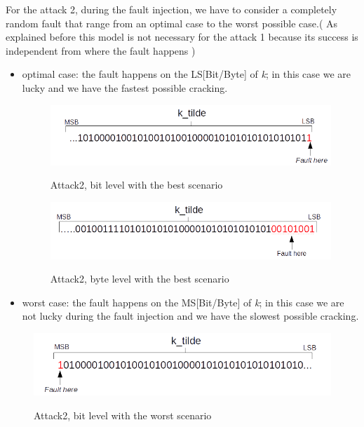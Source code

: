 \documentclass[11pt,english]{article}
\begin{document}
For the attack 2, during the fault injection, we have to consider a completely random fault that range from an optimal case to the worst possible case.( As explained before this model is not necessary for the attack 1 because its success is independent from where the fault happens )

\begin{itemize}
\item optimal case: the fault happens on the LS[Bit/Byte] of \textit{k}; in this case we are lucky and we have the fastest possible cracking.


\begin{figure}[H]
\includegraphics[width=1.0\textwidth]{img/bestcasebitfault.png} \\
\caption{\label{f_etichetta}Attack2, bit level with the best scenario }
\end{figure}

\begin{figure}[H]
\includegraphics[width=1.0\textwidth]{img/attack2bestbyte.png} \\
\caption{\label{f_etichetta}Attack2, byte level with the best scenario }
\end{figure}


\item worst case: the fault happens on the MS[Bit/Byte] of \textit{k}; in this case we are not lucky during the fault injection and we have the slowest possible cracking.
\end{itemize}

\begin{figure}[H]
\includegraphics[width=1.0\textwidth]{img/worstcasebitfault.png} \\
\caption{\label{f_etichetta}Attack2, bit level with the worst scenario }
\end{figure}
\end{document}
